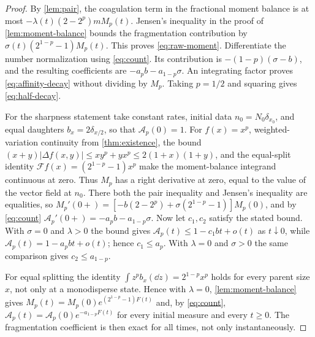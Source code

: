 \begin{proof}
By \cref{lem:pair}, the coagulation term in the fractional moment balance
is at most $-\lambda(t)(2-2^p)mM_p(t)$. Jensen's inequality in the proof of
\cref{lem:moment-balance} bounds the fragmentation contribution by
$\sigma(t)(2^{1-p}-1)M_p(t)$. This proves \eqref{eq:raw-moment}.
Differentiate the number normalization using \eqref{eq:count}.
Its contribution is $-(1-p)(\sigma-b)$, and the resulting coefficients
are $-a_p b-a_{1-p}\sigma$. An integrating factor proves
\eqref{eq:affinity-decay} without dividing by $M_p$.
Taking $p=1/2$ and squaring gives \eqref{eq:half-decay}.

For the sharpness statement take constant rates, initial data
$n_0=N_0\delta_{x_0}$, and equal daughters $b_x=2\delta_{x/2}$, so that
$\mathcal A_p(0)=1$. For $f(x)=x^p$, weighted-variation continuity from
\cref{thm:existence}, the bound
$(x+y)|\Delta f(x,y)|\leq xy^p+yx^p\leq2(1+x)(1+y)$,
and the equal-split identity $\mathcal F f(x)=(2^{1-p}-1)x^p$ make the
moment-balance integrand continuous at zero. Thus $M_p$ has a right
derivative at zero, equal to the value of the vector field at $n_0$.
There both the pair inequality and Jensen's inequality are equalities, so
$M_p'(0+)=[-b(2-2^p)+\sigma(2^{1-p}-1)]M_p(0)$, and by \eqref{eq:count}
$\mathcal A_p'(0+)=-a_pb-a_{1-p}\sigma$. Now let $c_1,c_2$ satisfy the
stated bound. With $\sigma=0$ and $\lambda>0$ the bound gives
$\mathcal A_p(t)\leq1-c_1bt+o(t)$ as $t\downarrow0$, while
$\mathcal A_p(t)=1-a_pbt+o(t)$; hence $c_1\leq a_p$. With $\lambda=0$ and
$\sigma>0$ the same comparison gives $c_2\leq a_{1-p}$.

For equal splitting the identity $\int z^pb_x(\dd z)=2^{1-p}x^p$ holds for
every parent size $x$, not only at a monodisperse state. Hence with
$\lambda=0$, \cref{lem:moment-balance} gives
$M_p(t)=M_p(0)e^{(2^{1-p}-1)F(t)}$ and, by \eqref{eq:count},
$\mathcal A_p(t)=\mathcal A_p(0)e^{-a_{1-p}F(t)}$ for every initial measure
and every $t\geq0$. The fragmentation coefficient is then exact for all
times, not only instantaneously.
\end{proof}

